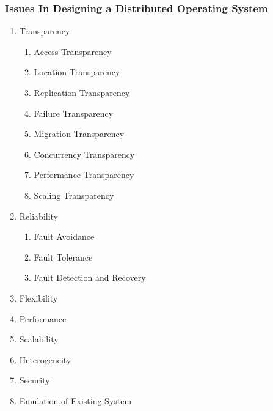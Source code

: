 \documentclass{beamer}
\begin{document}
\begin{frame}\label{list}
    \frametitle{Issues In Designing a Distributed Operating System}
    \begin{enumerate}
      	\item {Transparency
      	\begin{enumerate}
      		\item Access Transparency
        	\item Location Transparency
        	\item Replication Transparency
        	\item Failure Transparency
        	\item Migration Transparency
        	\item Concurrency Transparency
        	\item Performance Transparency
        	\item Scaling Transparency
      	\end{enumerate}}
      	\item {Reliability
      		\begin{enumerate}
      			\item Fault Avoidance
      			\item Fault Tolerance
      			\item Fault Detection and Recovery
      		\end{enumerate}}
      	\item Flexibility
      	\item Performance
      	\item Scalability
      	\item Heterogeneity
      	\item Security
      	\item Emulation of Existing System
    \end{enumerate}   
\end{frame}   
\end{document}
